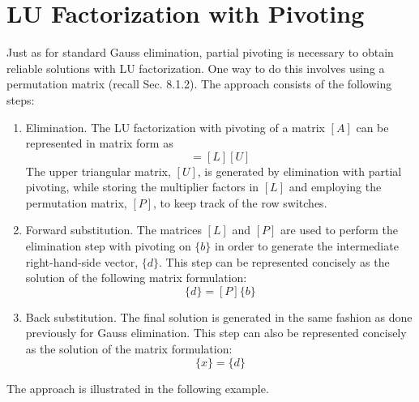 \documentclass[../main.tex]{subfiles}
\begin{document}
\section{LU Factorization with Pivoting}
Just as for standard Gauss elimination, partial pivoting is necessary to obtain reliable solutions with LU factorization. One way to do this involves using a permutation matrix (recall Sec. 8.1.2). The approach consists of the following steps:
\begin{enumerate}
\item Elimination. The LU factorization with pivoting of a matrix $[A]$ can be represented in matrix form as
\begin{equation}
[P][A] = [L][U]
\end{equation}
The upper triangular matrix, $[U]$, is generated by elimination with partial pivoting,
while storing the multiplier factors in $[L]$ and employing the permutation matrix, $[P]$, to keep track of the row switches.
\item Forward substitution. The matrices $[L]$ and $[P]$ are used to perform the elimination step with pivoting on $\{b\}$ in order to generate the intermediate right-hand-side vector, $\{d\}$. This step can be represented concisely as the solution of the following matrix
formulation:
\begin{equation}
[L]\{d\} = [P]\{b\}
\end{equation}
\item Back substitution. The final solution is generated in the same fashion as done previously for Gauss elimination. This step can also be represented concisely as the solution of the matrix formulation:
\begin{equation}
[U]\{x\}=\{d\}
\end{equation}
\end{enumerate}
The approach is illustrated in the following example.
\end{document}

